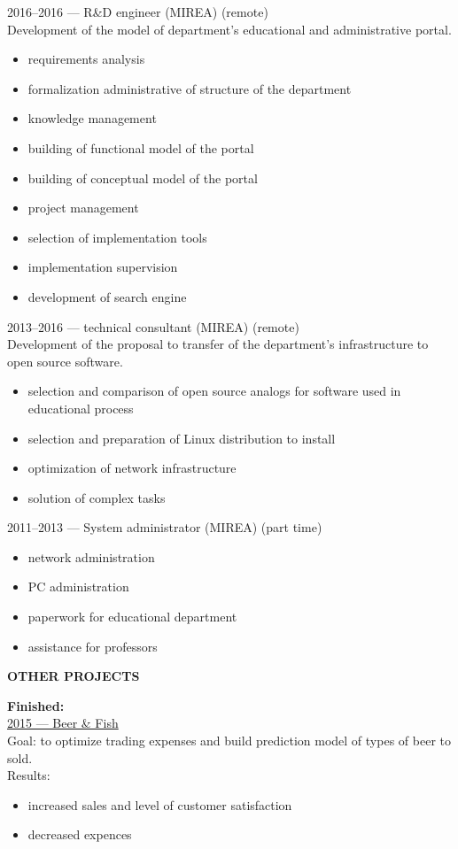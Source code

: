 \documentclass[a4paper,12pt,fullpage]{article}
\begin{document}
2016--2016 --- R\&D engineer (MIREA) (remote)\\
Development of the model of department's educational and administrative portal.
\begin{itemize}
	\item requirements analysis
	\item formalization administrative of structure of the department
	\item knowledge management
	\item building of functional model of the portal
	\item building of conceptual model of the portal
	\item project management
	\item selection of implementation tools
	\item implementation supervision
	\item development of search engine
\end{itemize}

2013--2016 --- technical consultant (MIREA) (remote)\\
Development of the proposal to transfer of the department's infrastructure to open source software.
\begin{itemize}
	\item selection and comparison of open source analogs for software used in educational process
	\item selection and preparation of Linux distribution to install
	\item optimization of network infrastructure
	\item solution of complex tasks\\
\end{itemize}

2011--2013 --- System administrator (MIREA) (part time)
\begin{itemize}
	\item network administration
	\item PC administration
	\item paperwork for educational department
	\item assistance for professors
\end{itemize}

\begin{center}
	\textbf{OTHER PROJECTS}
\end{center}

\textbf{Finished:}\\
\underline{2015 --- Beer \& Fish}\\
Goal: to optimize trading expenses and build prediction model of types of beer to sold.\\
Results:
\begin{itemize}
	\item increased sales and level of customer satisfaction
	\item decreased expences\\
\end{itemize}
\end{document}
